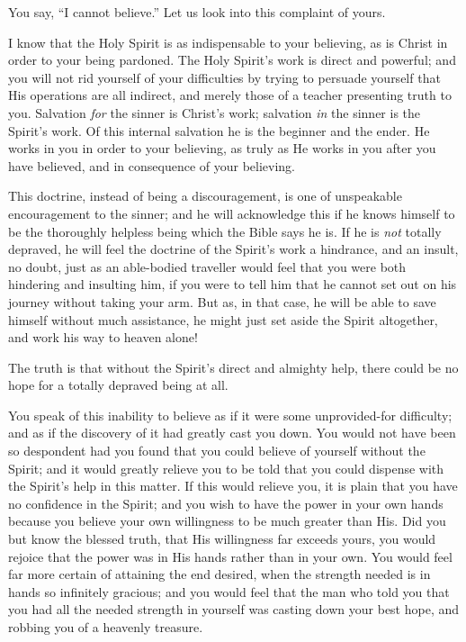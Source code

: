 \documentclass[
]{book}
\begin{document}
You say, ``I cannot believe.'' Let us look into this complaint of yours.

I know that the Holy Spirit is as indispensable to your believing, as is Christ in order to your being pardoned. The Holy Spirit's work is direct and powerful; and you will not rid yourself of your difficulties by trying to persuade yourself that His operations are all indirect, and merely those of a teacher presenting truth to you. Salvation \emph{for} the sinner is Christ's work; salvation \emph{in} the sinner is the Spirit's work. Of this internal salvation he is the beginner and the ender. He works in you in order to your believing, as truly as He works in you after you have believed, and in consequence of your believing.

This doctrine, instead of being a discouragement, is one of unspeakable encouragement to the sinner; and he will acknowledge this if he knows himself to be the thoroughly helpless being which the Bible says he is. If he is \emph{not} totally depraved, he will feel the doctrine of the Spirit's work a hindrance, and an insult, no doubt, just as an able-bodied traveller would feel that you were both hindering and insulting him, if you were to tell him that he cannot set out on his journey without taking your arm. But as, in that case, he will be able to save himself without much assistance, he might just set aside the Spirit altogether, and work his way to heaven alone!

The truth is that without the Spirit's direct and almighty help, there could be no hope for a totally depraved being at all.

You speak of this inability to believe as if it were some unprovided-for difficulty; and as if the discovery of it had greatly cast you down. You would not have been so despondent had you found that you could believe of yourself without the Spirit; and it would greatly relieve you to be told that you could dispense with the Spirit's help in this matter. If this would relieve you, it is plain that you have no confidence in the Spirit; and you wish to have the power in your own hands because you believe your own willingness to be much greater than His. Did you but know the blessed truth, that His willingness far exceeds yours, you would rejoice that the power was in His hands rather than in your own. You would feel far more certain of attaining the end desired, when the strength needed is in hands so infinitely gracious; and you would feel that the man who told you that you had all the needed strength in yourself was casting down your best hope, and robbing you of a heavenly treasure.
\end{document}
